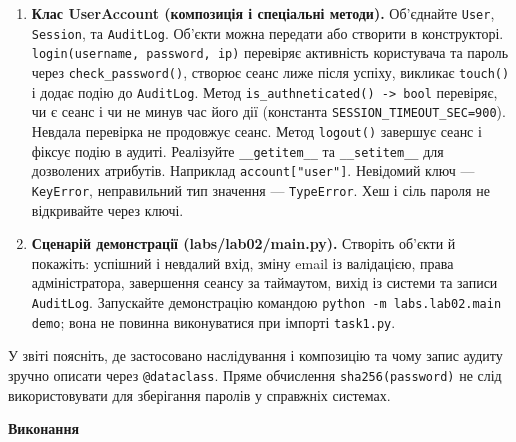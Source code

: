 \documentclass[10pt, a4paper]{article}
\begin{document}
\begin{enumerate}
	\item \textbf{Клас UserAccount (композиція і спеціальні методи).} Об'єднайте \verb|User|, \verb|Session|, та \verb|AuditLog|. Об'єкти можна передати або створити в конструкторі. \verb|login(username, password, ip)| перевіряє активність користувача та пароль через \verb|check_password()|, створює сеанс лиже після успіху, викликає \verb|touch()| і додає подію до \verb|AuditLog|. Метод \verb|is_authneticated() -> bool| перевіряє, чи є сеанс і чи не минув час його дії (константа \verb|SESSION_TIMEOUT_SEC=900|). Невдала перевірка не продовжує сеанс. Метод \verb|logout()| завершує сеанс і фіксує подію в аудиті. Реалізуйте \verb|__getitem__| та \verb|__setitem__| для дозволених атрибутів. Наприклад \verb|account["user"]|. Невідомий ключ --- \verb|KeyError|, неправильний тип значення --- \verb|TypeError|. Хеш і сіль пароля не відкривайте через ключі.
	\item \textbf{Сценарій демонстрації (labs/lab02/main.py).} Створіть об'єкти й покажіть: успішний і невдалий вхід, зміну email із валідацією, права адміністратора, завершення сеансу за таймаутом, вихід із системи та записи \verb|AuditLog|. Запускайте демонстрацію командою \verb|python -m labs.lab02.main demo|; вона не повинна виконуватися при імпорті \verb|task1.py|.
\end{enumerate}
У звіті поясніть, де застосовано наслідування і композицію та чому запис аудиту зручно описати через \verb|@dataclass|. Пряме обчислення \verb|sha256(password)| не слід використовувати для зберігання паролів у справжніх системах.

\textbf{Виконання}
\end{document}
